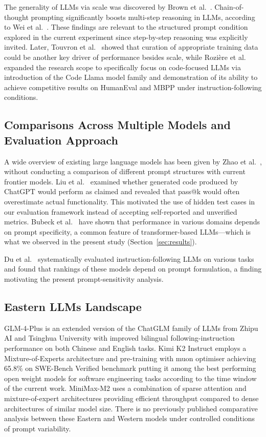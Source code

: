 \documentclass[conference]{IEEEtran}
\begin{document}
The generality of LLMs via scale was discovered by Brown et al.\ \cite{brown2020gpt3}. Chain-of-thought prompting significantly boosts multi-step reasoning in LLMs, according to Wei et al.\ \cite{wei2022cot}. These findings are relevant to the structured prompt condition explored in the current experiment since step-by-step reasoning was explicitly invited. Later, Touvron et al.\ \cite{touvron2023llama} showed that curation of appropriate training data could be another key driver of performance besides scale, while Rozière et al.\ \cite{roziere2023codellama} expanded the research scope to specifically focus on code-focused LLMs via introduction of the Code Llama model family and demonstration of its ability to achieve competitive results on HumanEval and MBPP under instruction-following conditions.

\subsection{Comparisons Across Multiple Models and Evaluation Approach}

A wide overview of existing large language models has been given by Zhao et al.\ \cite{zhao2023survey}, without conducting a comparison of different prompt structures with current frontier models. Liu et al.\ \cite{liu2023code} examined whether generated code produced by ChatGPT would perform as claimed and revealed that pass@k would often overestimate actual functionality. This motivated the use of hidden test cases in our evaluation framework instead of accepting self-reported and unverified metrics. Bubeck et al.\ \cite{bubeck2023sparks} have shown that performance in various domains depends on prompt specificity, a common feature of transformer-based LLMs—which is what we observed in the present study (Section~\ref{sec:results}).

Du et al.\ \cite{du2024llmeval} systematically evaluated instruction-following LLMs on various tasks and found that rankings of these models depend on prompt formulation, a finding motivating the present prompt-sensitivity analysis.

\subsection{Eastern LLMs Landscape}

GLM-4-Plus is an extended version of the ChatGLM family of LLMs from Zhipu AI and Tsinghua University \cite{zeng2024chatglm} with improved bilingual following-instruction performance on both Chinese and English tasks. Kimi K2 Instruct \cite{kimiteam2025k2} employs a Mixture-of-Experts architecture and pre-training with muon optimiser achieving 65.8\% on SWE-Bench Verified benchmark putting it among the best performing open weight models for software engineering tasks according to the time window of the current work. MiniMax-M2 \cite{minimax2025m2} uses a combination of sparse attention and mixture-of-expert architectures providing efficient throughput compared to dense architectures of similar model size. There is no previously published comparative analysis between these Eastern and Western models under controlled conditions of prompt variability.
\end{document}
